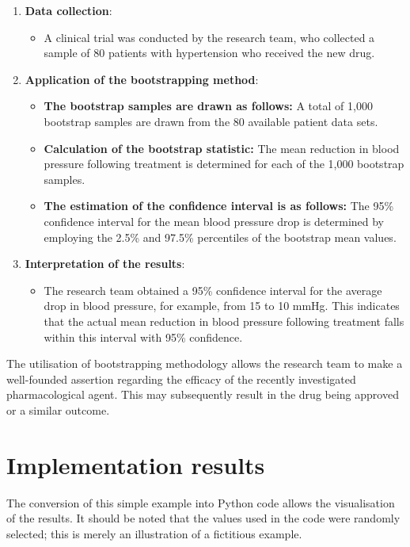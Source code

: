 \begin{enumerate}
    \item \textbf{Data collection}:
    \begin{itemize}
        \item A clinical trial was conducted by the research team, who collected a sample of 80 patients with hypertension who received the new drug.
    \end{itemize}
    
    \item \textbf{Application of the bootstrapping method}:
    \begin{itemize}
        \item \textbf{The bootstrap samples are drawn as follows:} A total of 1,000 bootstrap samples are drawn from the 80 available patient data sets.
        \item \textbf{Calculation of the bootstrap statistic:} The mean reduction in blood pressure following treatment is determined for each of the 1,000 bootstrap samples.
        \item \textbf{The estimation of the confidence interval is as follows: }The 95\% confidence interval for the mean blood pressure drop is determined by employing the 2.5\% and 97.5\% percentiles of the bootstrap mean values.
    \end{itemize}
    
    \item \textbf{Interpretation of the results}:
    \begin{itemize}
        \item The research team obtained a 95\% confidence interval for the average drop in blood pressure, for example, from 15 to 10 mmHg. This indicates that the actual mean reduction in blood pressure following treatment falls within this interval with 95\% confidence.
    \end{itemize}
\end{enumerate}

The utilisation of bootstrapping methodology allows the research team to make a well-founded assertion regarding the efficacy of the recently investigated pharmacological agent. This may subsequently result in the drug being approved or a similar outcome.
 
\section{Implementation results}
The conversion of this simple example into Python code allows the visualisation of the results. It should be noted that the values used in the code were randomly selected; this is merely an illustration of a fictitious example. 

